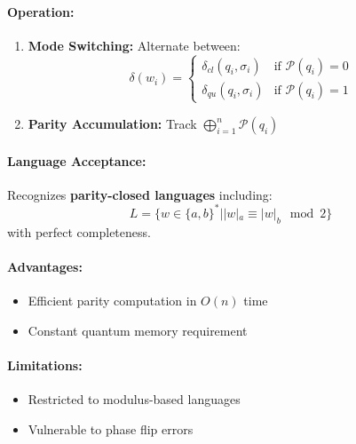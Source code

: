 \paragraph{Operation:}
\begin{enumerate}
    \item \textbf{Mode Switching:} Alternate between:
    \[
    \delta(w_i) = \begin{cases}
        \delta_{cl}(q_i, \sigma_i) & \text{if } \mathcal{P}(q_i) = 0 \\
        \delta_{qu}(q_i, \sigma_i) & \text{if } \mathcal{P}(q_i) = 1
    \end{cases}
    \]
    \item \textbf{Parity Accumulation:} Track $\bigoplus_{i=1}^n \mathcal{P}(q_i)$
\end{enumerate}

\paragraph{Language Acceptance:}
Recognizes \textbf{parity-closed languages} including:
\[
L = \{w \in \{a,b\}^* | |w|_a \equiv |w|_b \mod 2\} 
\]
\cite{hirvensalo2012quantum}
with perfect completeness.

\paragraph{Advantages:}
\begin{itemize}
    \item Efficient parity computation in $O(n)$ time
    \item Constant quantum memory requirement \cite{yakaryilmaz2011}
\end{itemize}

\paragraph{Limitations:}
\begin{itemize}
    \item Restricted to modulus-based languages
    \item Vulnerable to phase flip errors
\end{itemize}

\subsection{}
\label{subsec:bcqfa}


